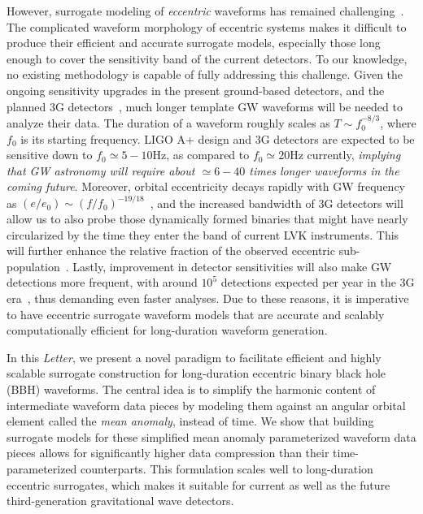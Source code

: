 \documentclass[reprint, superscriptaddress, amsmath, amssymb, aps, prl floatfix]{revtex4-2}
\begin{document}
However, surrogate modeling of \textit{eccentric} waveforms has remained challenging~\citep{Islam:2021mha, Yun:2021jnh, Shi:2024age, Islam:2025llx, Islam:2025rjl}. The complicated waveform morphology of eccentric systems makes it difficult to produce their efficient and accurate surrogate models, especially those long enough to cover the sensitivity band of the current detectors. To our knowledge, no existing methodology is capable of fully addressing this challenge. 
Given the ongoing sensitivity upgrades in the present ground-based detectors, and the planned 3G detectors~\citep{2017arXiv170200786A, Punturo:2010zz, Hild:2011np, Reitze:2019iox, LIGOScientific:2016wof}, much longer template GW waveforms will be needed to analyze their data. The duration of a waveform roughly scales as $T \sim f_0^{-8/3}$, where $f_0$ is its starting frequency. LIGO A+ design and 3G detectors are expected to be sensitive down to $f_0 \simeq 5-10$Hz, as compared to $f_0 \simeq 20$Hz currently, \textit{implying that GW astronomy will require about $\simeq 6-40$ times longer waveforms in the coming future}. 
Moreover, orbital eccentricity decays rapidly with GW frequency as $(e/e_0) \sim (f/f_0)^{-19/18}$~\citep{PhysRev.136.B1224}, and the increased bandwidth of 3G detectors will allow us to also probe those dynamically formed binaries that might have nearly circularized by the time they enter the band of current LVK instruments. This will further enhance the relative fraction of the observed eccentric sub-population~\citep{Saini:2023wdk}.
Lastly, improvement in detector sensitivities will also make GW detections more frequent, with around $10^5$ detections expected per year in the 3G era~\citep{Reitze:2019iox, ET:2019dnz}, thus demanding even faster analyses. Due to these reasons, it is imperative to have eccentric surrogate waveform models that are accurate and scalably computationally efficient for long-duration waveform generation. 

In this \textit{Letter}, we present a novel paradigm to facilitate efficient and highly scalable surrogate construction for long-duration eccentric binary black hole (BBH) waveforms. The central idea is to simplify the harmonic content of intermediate waveform data pieces by modeling them against an angular orbital element called the \textit{mean anomaly}, instead of time. We show that building surrogate models for these simplified mean anomaly parameterized waveform data pieces allows for significantly higher data compression than their time-parameterized counterparts. This formulation scales well to long-duration eccentric surrogates, which makes it suitable for current as well as the future third-generation gravitational wave detectors.
\end{document}

